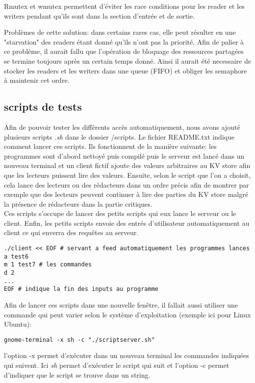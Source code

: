 \documentclass[11pt,a4paper]{article}
\begin{document}
Rmutex et wmutex permettent d'éviter les race conditions pour les reader et les writers pendant qu'ils sont dans la section d'entrée et de sortie.

Problèmes de cette solution: dans certains rares cas, elle peut résulter en une "starvation" des readers étant donné qu'ils n'ont pas la priorité. Afin de palier à ce problème, il aurait fallu que l'opération de bloquage des ressources partagées se termine toujours après un certain temps donné. Ainsi il aurait été necessaire de stocker les readers et les writers dans une queue (FIFO) et obliger les semaphore à maintenir cet ordre.

\subsection{scripts de tests}
Afin de pouvoir tester les différents accès automatiquement, nous avons ajouté plusieurs scripts \textit{.sh} dans le dossier /scripts. Le fichier README.txt indique comment lancer ces scripts. Ils fonctionnent de la manière suivante: les programmes sont d'abord nettoyé puis compilé puis le serveur est lancé dans un nouveau terminal et un client fictif ajoute des valeurs arbitraires au KV store afin que les lecteurs puissent lire des valeurs. Ensuite, selon le script que l'on a choisit, cela lance des lecteurs ou des rédacteurs dans un ordre précis afin de montrer par exemple que des lecteurs peuvent continuer à lire des parties du KV store malgré la présence de rédacteurs dans la partie critiques. \\
Ces scripts s'occupe de lancer des petits scripts qui eux lance le serveur ou le client. Enfin, les petits scripts envoie des entrés d'utilisateur automatiquement au client ce qui enverra des requêtes au serveur. 
\begin{lstlisting}
./client << EOF # servant a feed automatiquement les programmes lances
a test6
m 1 test7 # les commandes 
d 2
...
EOF # indique la fin des inputs au programme
\end{lstlisting}
Afin de lancer ces scripts dans une nouvelle fenêtre, il fallait aussi utiliser une commande qui peut varier selon le système d'exploitation (exemple ici pour Linux Ubuntu):
\begin{lstlisting}
gnome-terminal -x sh -c "./scriptserver.sh" 
\end{lstlisting}
l'option -x permet d'exécuter dans un nouveau terminal les commandes indiquées qui suivent. Ici \textit{sh} permet d'exécuter le script qui suit et l'option -c permet d'indiquer que le script se trouve dans un string.
\end{document}

